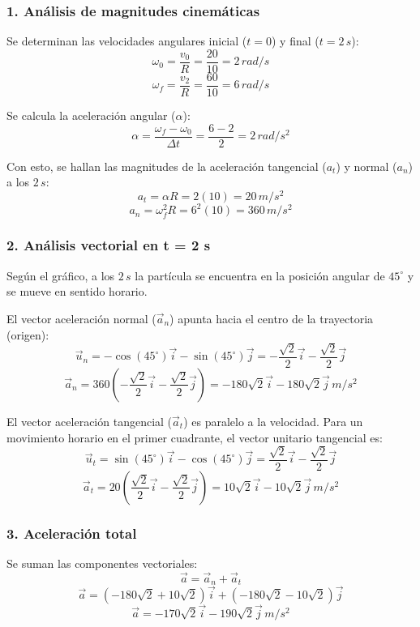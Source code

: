 \documentclass[12pt, a4paper]{article}
\begin{document}
\subsubsection*{1. Análisis de magnitudes cinemáticas}
Se determinan las velocidades angulares inicial ($t=0$) y final ($t=2 \, \si{s}$):
$$ \omega_0 = \frac{v_0}{R} = \frac{20}{10} = 2 \, \si{rad/s} $$
$$ \omega_f = \frac{v_2}{R} = \frac{60}{10} = 6 \, \si{rad/s} $$

Se calcula la aceleración angular ($\alpha$):
$$ \alpha = \frac{\omega_f - \omega_0}{\Delta t} = \frac{6 - 2}{2} = 2 \, \si{rad/s^2} $$

Con esto, se hallan las magnitudes de la aceleración tangencial ($a_t$) y normal ($a_n$) a los $2 \, \si{s}$:
$$ a_t = \alpha R = 2(10) = 20 \, \si{m/s^2} $$
$$ a_n = \omega_f^2 R = 6^2(10) = 360 \, \si{m/s^2} $$

\subsubsection*{2. Análisis vectorial en t = 2 s}
Según el gráfico, a los $2 \, \si{s}$ la partícula se encuentra en la posición angular de $45^\circ$ y se mueve en sentido horario.

El vector aceleración normal ($\vec{a}_n$) apunta hacia el centro de la trayectoria (origen):
$$ \vec{u}_n = -\cos(45^\circ)\vec{i} - \sin(45^\circ)\vec{j} = -\frac{\sqrt{2}}{2}\vec{i} - \frac{\sqrt{2}}{2}\vec{j} $$
$$ \vec{a}_n = 360 \left(-\frac{\sqrt{2}}{2}\vec{i} - \frac{\sqrt{2}}{2}\vec{j}\right) = -180\sqrt{2}\vec{i} - 180\sqrt{2}\vec{j} \, \si{m/s^2} $$

El vector aceleración tangencial ($\vec{a}_t$) es paralelo a la velocidad. Para un movimiento horario en el primer cuadrante, el vector unitario tangencial es:
$$ \vec{u}_t = \sin(45^\circ)\vec{i} - \cos(45^\circ)\vec{j} = \frac{\sqrt{2}}{2}\vec{i} - \frac{\sqrt{2}}{2}\vec{j} $$
$$ \vec{a}_t = 20 \left(\frac{\sqrt{2}}{2}\vec{i} - \frac{\sqrt{2}}{2}\vec{j}\right) = 10\sqrt{2}\vec{i} - 10\sqrt{2}\vec{j} \, \si{m/s^2} $$

\subsubsection*{3. Aceleración total}
Se suman las componentes vectoriales:
$$ \vec{a} = \vec{a}_n + \vec{a}_t $$
$$ \vec{a} = (-180\sqrt{2} + 10\sqrt{2})\vec{i} + (-180\sqrt{2} - 10\sqrt{2})\vec{j} $$
$$ \vec{a} = -170\sqrt{2}\vec{i} - 190\sqrt{2}\vec{j} \, \si{m/s^2} $$
\end{document}
